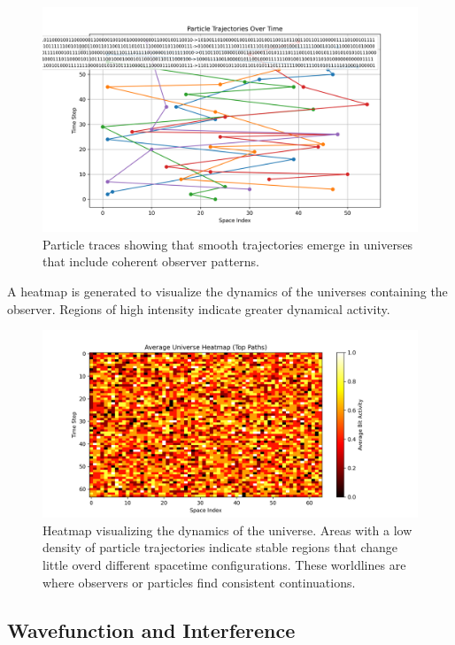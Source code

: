 \documentclass[12pt]{article}
\begin{document}
\begin{figure}[h!]
      \centering
      \includegraphics[width=1.0\textwidth]{figures/particle_trajectories.png}
      \caption{Particle traces showing that smooth trajectories emerge in universes that include coherent observer patterns.}
      \label{fig:particle_trajectories}
\end{figure}

A heatmap is generated to visualize the dynamics of the universes containing the observer. Regions of high intensity indicate greater dynamical activity.

\begin{figure}[h!]
      \centering
      \includegraphics[width=1.0\textwidth]{figures/average_universe_heatmap.png}
      \caption{Heatmap visualizing the dynamics of the universe. Areas with a low density of particle trajectories indicate stable regions that change little overd different spacetime configurations. These worldlines are where observers or particles find consistent continuations.}
      \label{fig:average_universe_heatmap}
\end{figure}

\subsection{Wavefunction and Interference}
\end{document}
